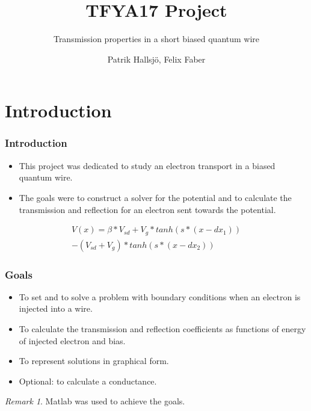 \documentclass[•]{beamer}
\subtitle{Transmission properties in a short biased quantum wire}
\title{TFYA17 Project}
\author{Patrik Hallsj\"{o}, Felix Faber}
\date{}
\theoremstyle{remark}
\newtheorem{remark}[theorem]{Remark}
\begin{document}
\begin{frame}
\titlepage
\end{frame}
\begin{frame}
\tableofcontents
\end{frame}
\section{Introduction}
\begin{frame}[shrink=10]\frametitle{Introduction}
\begin{block}

\begin{itemize}
\item This project was dedicated to study an electron transport in a biased quantum wire.
\item The goals were to construct a solver for the potential and to calculate the transmission and reflection for an electron sent towards the potential.
\end{itemize}
\end{block}
\end{frame}

\begin{frame}
\begin{block}

\begin{eqnarray*}
\label{potential}
V(x) = \beta*V_{sd}+V_{g}*tanh(s*(x-dx_{1}))\\
-(V_{sd}+V_{g})*tanh(s*(x-dx_{2}))
\end{eqnarray*}
\end{block}
\end{frame}

\begin{frame}\frametitle{Goals}
\begin{block}

\begin{itemize}
\item To set and to solve a problem with boundary conditions when an electron is injected into a wire.
\item To calculate the transmission and reflection coefficients as functions of energy of injected electron and bias.
\item To represent solutions in graphical form.
\item Optional: to calculate a conductance.
\end{itemize}
\end{block}
\pause
\begin{remark}
Matlab was used to achieve the goals.
\end{remark}
\end{frame}
\end{document}

